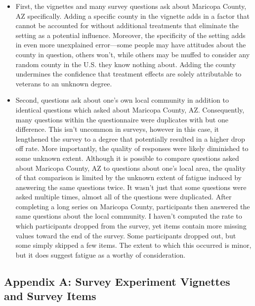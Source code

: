 \documentclass[
  12pt,
  letterpaper,
]{article}
\providecommand{\tightlist}{%
  \setlength{\itemsep}{0pt}\setlength{\parskip}{0pt}}\usepackage{longtable,booktabs,array}
\begin{document}
\begin{itemize}
  \begin{itemize}
  \tightlist
  \item
    First, the vignettes and many survey questions ask about Maricopa
    County, AZ specifically. Adding a specific county in the vignette
    adds in a factor that cannot be accounted for without additional
    treatments that eliminate the setting as a potential influence.
    Moreover, the specificity of the setting adds in even more
    unexplained error---some people may have attitudes about the county
    in question, others won't, while others may be muffed to consider
    any random county in the U.S. they know nothing about. Adding the
    county undermines the confidence that treatment effects are solely
    attributable to veterans to an unknown degree.
  \item
    Second, questions ask about one's own local community in addition to
    identical questions which asked about Maricopa County, AZ.
    Consequently, many questions within the questionnaire were
    duplicates with but one difference. This isn't uncommon in surveys,
    however in this case, it lengthened the survey to a degree that
    potentially resulted in a higher drop off rate. More importantly,
    the quality of responses were likely diminished to some unknown
    extent. Although it is possible to compare questions asked about
    Maricopa County, AZ to questions about one's local area, the quality
    of that comparison is limited by the unknown extent of fatigue
    induced by answering the same questions twice. It wasn't just that
    some questions were asked multiple times, almost all of the
    questions were duplicated. After completing a long series on
    Maricopa County, participants then answered the same questions about
    the local community. I haven't computed the rate to which
    participants dropped from the survey, yet items contain more missing
    values toward the end of the survey. Some participants dropped out,
    but some simply skipped a few items. The extent to which this
    occurred is minor, but it does suggest fatigue as a worthy of
    consideration.
  \end{itemize}
\end{itemize}

\pagebreak

\subsection{Appendix A: Survey Experiment Vignettes and Survey
Items}\label{sec-appendix-a}
\end{document}

